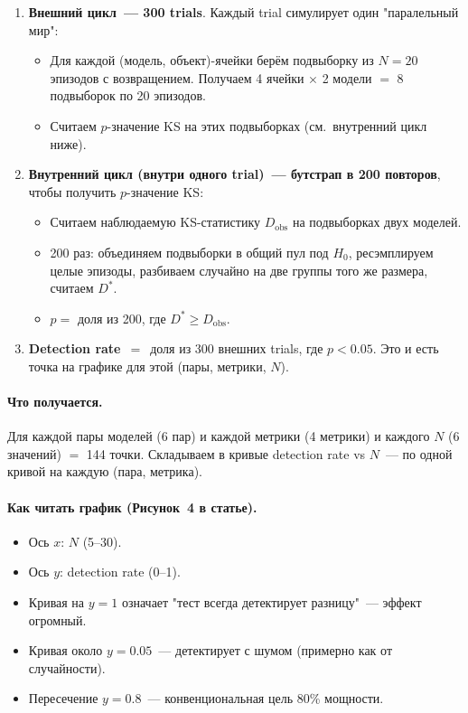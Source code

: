 \documentclass[11pt]{article}
\begin{document}
\begin{enumerate}[leftmargin=2em, itemsep=2pt]
\item \textbf{Внешний цикл~--- 300 trials}. Каждый trial симулирует один "паралельный мир":
   \begin{itemize}[leftmargin=1.5em, itemsep=0pt]
   \item Для каждой (модель, объект)-ячейки берём подвыборку из $N=20$ эпизодов с возвращением. Получаем 4 ячейки $\times$ 2 модели $=$ 8 подвыборок по 20 эпизодов.
   \item Считаем $p$-значение KS на этих подвыборках (см.\ внутренний цикл ниже).
   \end{itemize}
\item \textbf{Внутренний цикл (внутри одного trial)~--- бутстрап в 200 повторов}, чтобы получить $p$-значение KS:
   \begin{itemize}[leftmargin=1.5em, itemsep=0pt]
   \item Считаем наблюдаемую KS-статистику $D_{\text{obs}}$ на подвыборках двух моделей.
   \item 200 раз: объединяем подвыборки в общий пул под $H_0$, ресэмплируем целые эпизоды, разбиваем случайно на две группы того же размера, считаем $D^*$.
   \item $p = $ доля из 200, где $D^* \ge D_{\text{obs}}$.
   \end{itemize}
\item \textbf{Detection rate}~$=$~доля из 300 внешних trials, где $p < 0.05$. Это и есть точка на графике для этой (пары, метрики, $N$).
\end{enumerate}

\paragraph{Что получается.} Для каждой пары моделей (6 пар) и каждой метрики (4 метрики) и каждого $N$ (6 значений) $=$ 144 точки. Складываем в кривые detection rate vs $N$~--- по одной кривой на каждую (пара, метрика).

\paragraph{Как читать график (Рисунок~4 в статье).}
\begin{itemize}[leftmargin=2em, itemsep=1pt]
\item Ось $x$: $N$ (5--30).
\item Ось $y$: detection rate (0--1).
\item Кривая на $y=1$ означает "тест всегда детектирует разницу"~--- эффект огромный.
\item Кривая около $y=0.05$~--- детектирует с шумом (примерно как от случайности).
\item Пересечение $y=0.8$~--- конвенциональная цель 80\% мощности.
\end{itemize}
\end{document}
